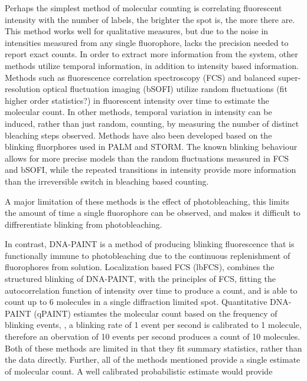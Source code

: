 Perhaps the simplest method of molecular counting is correlating fluorescent
  intensity with the number of labels, \ie the brighter the spot is, the more there are.
  This method works well for qualitative measures, but due to the noise in intensities 
  measured from any single fluorophore, lacks the precision needed to report exact counts.
  In order to extract more information from the system, other methods utilize temporal information, 
  in addition to intensity based information. 
  Methods such as fluorescence correlation spectroscopy (FCS) and 
  balanced super-resolution optical fluctuation imaging (bSOFI)
  utilize random fluctuations (fit higher order statistics?) in fluorescent intensity over time to estimate the molecular count.
  In other methods, temporal variation in intensity can be induced, rather than just random, \ie
  counting, by measuring the number of distinct bleaching steps observed.
  Methods have also been developed based on the blinking fluorphores used in PALM and STORM. 
  The known blinking behaviour allows for more precise models than the random fluctuations measured in FCS and bSOFI, while the 
  repeated transitions in intensity provide more information than the irreversible switch in bleaching based counting.


  A major limitation of these methods is the effect of photobleaching, this limits the amount of time
  a single fluorophore can be observed, and makes it difficult to diffrerentiate blinking from photobleaching.


In contrast, DNA-PAINT is a method of producing blinking fluorescence that is functionally
    immune to photobleaching due to the continuous replenishment of fluorophores from solution.
    Localization based FCS (lbFCS), combines the structured blinking of DNA-PAINT, with the 
    principles of FCS, fitting the autocorrelation function of intensity over time to produce a count,
    and is able to count up to 6 molecules in a single diffraction limited spot.
    Quantitative DNA-PAINT (qPAINT) estiamtes the molecular count based on the frequency of blinking events, \ie, 
    a blinking rate of 1 event per second is calibrated to 1 molecule, therefore an obervation of 10 events per second
    produces a count of 10 molecules.
    Both of these methods are limited in that they fit summary statistics,
    rather than the data directly. 
    Further, all of the methods mentioned provide a single estimate of molecular count.
    A well calibrated probabilistic estimate would provide 
    
